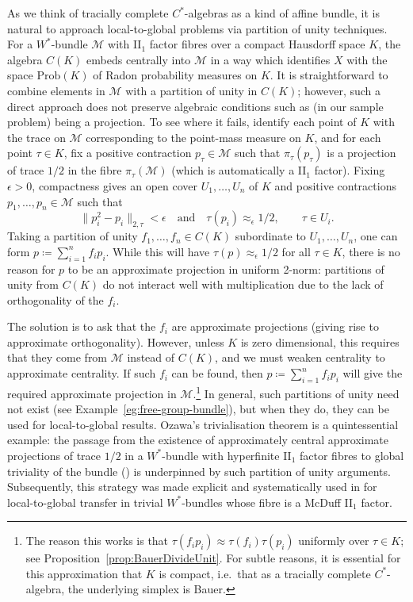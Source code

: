 \documentclass[a4paper,11pt]{amsart}
\theoremstyle{definition}
\numberwithin{equation}{section}
\numberwithin{theorem}{section}
\newcommand{\M}{\mathcal{M}}
\begin{document}
As we think of tracially complete $C^*$-algebras as a kind of affine bundle, it is natural to approach local-to-global problems via partition of unity techniques.  For a $W^*$-bundle $\M$ with II$_1$ factor fibres over a compact Hausdorff space $K$, the algebra $C(K)$ embeds centrally into $\M$ in a way which identifies $X$ with the space $\mathrm{Prob}(K)$ of Radon probability measures on $K$.  It is straightforward to combine elements in $\M$ with a partition of unity in $C(K)$; however, such a direct approach does not preserve algebraic conditions such as (in our sample problem) being a projection.  To see where it fails, identify each point of $K$ with the trace on $\mathcal M$ corresponding to the point-mass measure on $K$, and for each point $\tau\in K$, fix a positive contraction $p_\tau\in\M$ such that $\pi_\tau(p_\tau)$ is a projection of trace $1/2$ in the fibre $\pi_\tau(\M)$ (which is automatically a II$_1$ factor). Fixing $\epsilon>0$, compactness gives an open cover $U_1,\dots,U_n$ of $K$ and positive contractions $p_1,\dots,p_n\in \M$ such that \begin{equation}
    \|p_{i}^2-p_{i}\|_{2,\tau}<\epsilon \quad \text{and} \quad \tau(p_i) \approx_\epsilon 1/2,\qquad \tau \in U_i.
\end{equation}
Taking a partition of unity $f_1,\dots,f_n\in C(K)$ subordinate to $U_1,\dots,U_n$, one can form $p\coloneqq \sum_{i=1}^nf_ip_{i}$. While this will have $\tau(p)\approx_\epsilon 1/2$ for all $\tau\in K$, there is no reason for $p$ to be an approximate projection in uniform 2-norm: partitions of unity from $C(K)$ do not interact well with multiplication due to the lack of orthogonality of the $f_i$.

The solution is to ask that the $f_i$ are approximate projections (giving rise to approximate orthogonality).  However, unless $K$ is zero dimensional, this requires that they come from $\M$ instead of $C(K)$, and we must weaken centrality to approximate centrality. If such $f_i$ can be found, then $p\coloneqq \sum_{i=1}^nf_i p_i$ will give the required approximate
projection in $\M$.\footnote{The reason this works is that $\tau(f_ip_i)\approx\tau(f_i)\tau(p_i)$ uniformly over  $\tau\in K$; see Proposition~\ref{prop:BauerDivideUnit}. For subtle reasons, it is essential for this approximation that $K$ is compact, i.e.\ that as a tracially complete $C^*$-algebra, the underlying simplex is Bauer.\label{fn:TracialFactorisation}}  In general, such partitions of unity need not exist (see Example~\ref{eg:free-group-bundle}), but when they do, they can be used for local-to-global results.  Ozawa's trivialisation theorem is a quintessential example: the passage from the existence of approximately central approximate projections of trace $1/2$ in a $W^*$-bundle with hyperfinite II$_1$ factor fibres to global triviality of the bundle (\cite[Theorem~15(ii)$\Rightarrow$(iii)$\Rightarrow$(i)]{Oz13}) is underpinned by such partition of unity arguments.  Subsequently, this strategy was made explicit and systematically used in \cite{BBSTWW} for local-to-global transfer in trivial $W^*$-bundles whose fibre is a McDuff II$_1$ factor.
\end{document}
